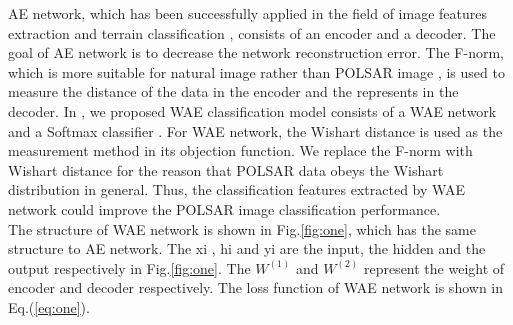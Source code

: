 \documentclass[11pt, a4paper, onecolumn, oneside]{article}
\begin{document}
AE network, which has been successfully applied in the field of image features extraction and terrain classification \cite{w, x}, consists of an encoder and a decoder. The goal of AE network is to decrease the network reconstruction error. The F-norm, which is more suitable for natural image rather than POLSAR image \cite{y}, is used to measure the distance of the data in the encoder and the represents in the decoder. In \cite{c}, we proposed WAE classification model consists of a WAE network and a Softmax classifier \cite{z}. For WAE network, the Wishart distance is used as the measurement method in its objection function. We replace the F-norm with Wishart distance for the reason that POLSAR data obeys the Wishart distribution in general. Thus, the classification features extracted by WAE network could improve the POLSAR image classification performance.\\

The structure of WAE network is shown in Fig.\ref{fig:one}, which has the same structure to AE network. The xi , hi and yi are the input, the hidden and the output respectively in Fig.\ref{fig:one}. The $W^{(1)}$ and $W^{(2)}$ represent the weight of encoder and decoder respectively. The loss function of WAE network is shown in Eq.(\ref{eq:one}).
\end{document}

